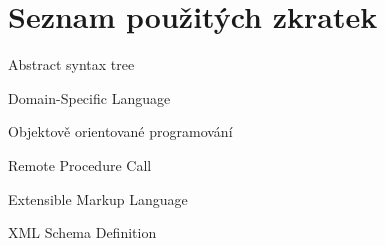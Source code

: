 \usepackage[T1]{fontenc}
\usepackage[utf8]{inputenc}


\chapter{Seznam použitých zkratek}

\begin{description}[align=left]
    \item [AST] Abstract syntax tree
    \item [DSL] Domain-Specific Language
    \item [OOP] Objektově orientované programování
    \item [RPC] Remote Procedure Call
    \item [XML] Extensible Markup Language
    \item [XSD] XML Schema Definition
\end{description}
